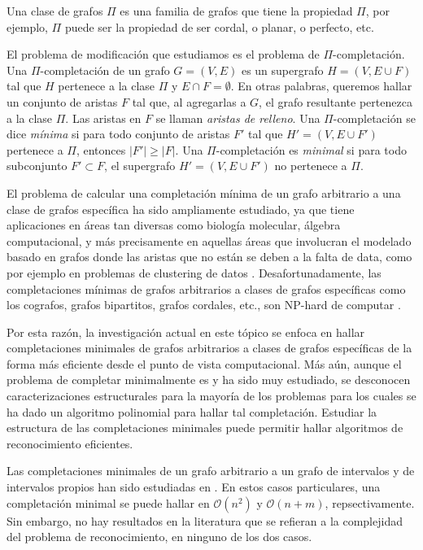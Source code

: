 \documentclass[12pt]{book}
\theoremstyle{plain}
\theoremstyle{remark}
\begin{document}
Una clase de grafos $\Pi$ es una familia de grafos que tiene la propiedad $\Pi$, por ejemplo, $\Pi$ puede ser la propiedad de ser cordal, o planar, o perfecto, etc. 

El problema de modificación que estudiamos es el problema de $\Pi$-completación.
Una $\Pi$-completación de un grafo $G=(V,E)$ es un supergrafo $H = (V, E \cup F)$ tal que $H$ pertenece a la clase $\Pi$ y $E \cap F = \emptyset$. En otras palabras, queremos hallar un conjunto de aristas $F$ tal que, al agregarlas a $G$, el grafo resultante pertenezca a la clase $\Pi$. Las aristas en $F$ se llaman \emph{aristas de relleno}.
Una $\Pi$-completación se dice \emph{mínima }si para todo conjunto de aristas $F'$ tal que $H'= (V, E \cup F')$ pertenece a $\Pi$, entonces $|F'| \geq |F|$. Una $\Pi$-completación es \emph{minimal }si para todo subconjunto $F' \subset F$, el supergrafo $H'= (V, E \cup F')$ no pertenece a $\Pi$. 


El problema de calcular una completación mínima de un grafo arbitrario a una clase de grafos específica ha sido ampliamente estudiado, ya que tiene aplicaciones en áreas tan diversas como biología molecular, álgebra computacional, y más precisamente en aquellas áreas que involucran el modelado basado en grafos donde las aristas que no están se deben a la falta de data, como por ejemplo en problemas de clustering de datos \cite{GGKS95,NSS01}.
Desafortunadamente, las completaciones mínimas de grafos arbitrarios a clases de grafos específicas como los cografos, grafos bipartitos, grafos cordales, etc., son NP-hard de computar \cite{NSS01,BBD06,Y81}. 

Por esta razón, la investigación actual en este tópico se enfoca en hallar completaciones minimales de grafos arbitrarios a clases de grafos específicas de la forma más eficiente desde el punto de vista computacional. Más aún, aunque el problema de completar minimalmente es y ha sido muy estudiado, se desconocen caracterizaciones estructurales para la mayoría de los problemas para los cuales se ha dado un algoritmo polinomial para hallar tal completación. Estudiar la estructura de las completaciones minimales puede permitir hallar algoritmos de reconocimiento eficientes. 

Las completaciones minimales de un grafo arbitrario a un grafo de intervalos y de intervalos propios han sido estudiadas en \cite{CT13,RST06}.
En estos casos particulares, una completación minimal se puede hallar en $\mathcal{O}(n^2)$ y $\mathcal{O}(n+m)$, repsectivamente. Sin embargo, no hay resultados en la literatura que se refieran a la complejidad del problema de reconocimiento, en ninguno de los dos casos.
\end{document}
